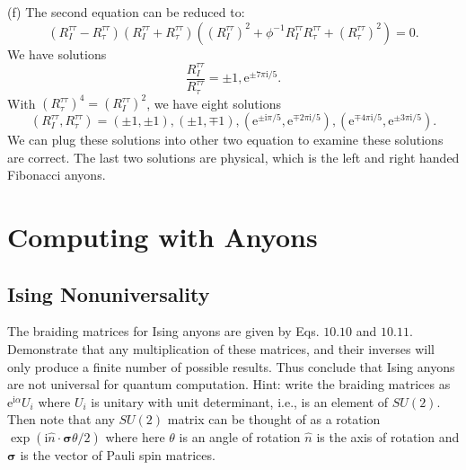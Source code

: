 \documentclass{book}
\begin{document}
(f) The second equation can be reduced to:
\begin{equation*}
(R_{I}^{\tau \tau } -R_{\tau }^{\tau \tau } )(R_{I}^{\tau \tau } +R_{\tau }^{\tau \tau } )((R_{I}^{\tau \tau } )^{2} +\phi ^{-1} R_{I}^{\tau \tau } R_{\tau }^{\tau \tau } +(R_{\tau }^{\tau \tau } )^{2} )=0.
\end{equation*}
We have solutions
\begin{equation*}
\frac{R_{I}^{\tau \tau }}{R_{\tau }^{\tau \tau }} =\pm 1,\mathrm{e}^{\pm 7\pi \mathrm{i} /5} .
\end{equation*}
With $(R_{\tau }^{\tau \tau } )^{4} =(R_{I}^{\tau \tau } )^{2}$, we have eight solutions
\begin{equation*}
(R_{I}^{\tau \tau } ,R_{\tau }^{\tau \tau } )=(\pm 1,\pm 1),(\pm 1,\mp 1),(\mathrm{e}^{\pm \mathrm{i} \pi /5} ,\mathrm{e}^{\mp 2\pi \mathrm{i} /5} ),(\mathrm{e}^{\mp 4\pi \mathrm{i} /5} ,\mathrm{e}^{\pm 3\pi \mathrm{i} /5} ).
\end{equation*}
We can plug these solutions into other two equation to examine these solutions are correct. The last two solutions are physical, which is the left and right handed Fibonacci anyons. 

\chapter{Computing with Anyons}
\section{Ising Nonuniversality}
The braiding matrices for Ising anyons are given by Eqs. $10.10$ and $10.11$. Demonstrate that any multiplication of these matrices, and their inverses will only produce a finite number of possible results. Thus conclude that Ising anyons are not universal for quantum computation. Hint: write the braiding matrices as $\mathrm{e}^{\mathrm{i} \alpha } U_{i}$ where $U_{i}$ is unitary with unit determinant, i.e., is an element of $SU(2)$. Then note that any $SU(2)$ matrix can be thought of as a rotation $\exp (\mathrm{i}\hat{n} \cdot \boldsymbol{\sigma } \theta /2)$ where here $\theta $ is an angle of rotation $\hat{n}$ is the axis of rotation and $\boldsymbol{\sigma }$ is the vector of Pauli spin matrices.
\end{document}
